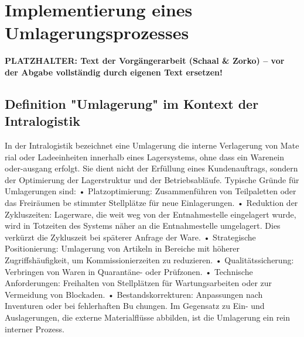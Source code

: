 \section{Implementierung eines Umlagerungsprozesses}

\noindent\colorbox{red!15}{\parbox{\dimexpr\textwidth-2\fboxsep}{\textbf{\color{red}PLATZHALTER: Text der Vorgängerarbeit (Schaal \& Zorko) – vor der Abgabe vollständig durch eigenen Text ersetzen!}}}

\subsection{Definition "Umlagerung" im Kontext der Intralogistik}
In der Intralogistik bezeichnet eine Umlagerung die interne Verlagerung von Mate
rial oder Ladeeinheiten innerhalb eines Lagersystems, ohne dass ein Warenein
oder-ausgang erfolgt. Sie dient nicht der Erfüllung eines Kundenauftrags, sondern
der Optimierung der Lagerstruktur und der Betriebsabläufe. Typische Gründe für
Umlagerungen sind:
• Platzoptimierung: Zusammenführen von Teilpaletten oder das Freiräumen be
stimmter Stellplätze für neue Einlagerungen.
• Reduktion der Zykluszeiten: Lagerware, die weit weg von der Entnahmestelle
eingelagert wurde, wird in Totzeiten des Systems näher an die Entnahmestelle
umgelagert. Dies verkürzt die Zykluszeit bei späterer Anfrage der Ware.
• Strategische Positionierung: Umlagerung von Artikeln in Bereiche mit höherer
Zugriffshäufigkeit, um Kommissionierzeiten zu reduzieren.
• Qualitätssicherung: Verbringen von Waren in Quarantäne- oder Prüfzonen.
• Technische Anforderungen: Freihalten von Stellplätzen für Wartungsarbeiten
oder zur Vermeidung von Blockaden.
• Bestandskorrekturen: Anpassungen nach Inventuren oder bei fehlerhaften Bu
chungen.
Im Gegensatz zu Ein- und Auslagerungen, die externe Materialflüsse abbilden, ist die
Umlagerung ein rein interner Prozess.



